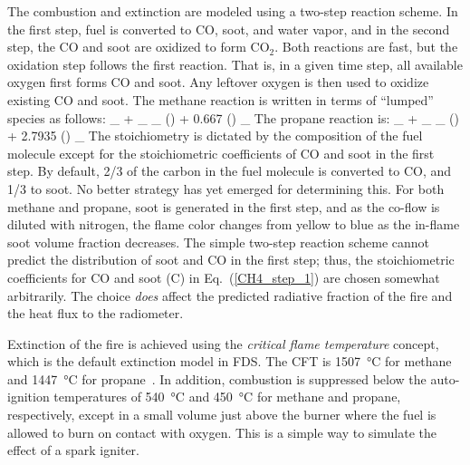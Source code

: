 The combustion and extinction are modeled using a two-step reaction scheme. In the first step, fuel is converted to CO, soot, and water vapor, and in the second step, the CO and soot are oxidized to form CO$_2$. Both reactions are fast, but the oxidation step follows the first reaction. That is, in a given time step, all available oxygen first forms CO and soot. Any leftover oxygen is then used to oxidize existing CO and soot. The methane reaction is written in terms of ``lumped'' species as follows:
\be
{}_ \; +  \; _ \longrightarrow
{}_ \label{CH4_step_1}
\ee
\be
() + 0.667 \; () \longrightarrow  {}_
\ee
The propane reaction is:
\be
{}_ \; +  \; _ \longrightarrow
{}_
\ee
\be
() + 2.7935 \; () \longrightarrow  {}_
\ee
The stoichiometry is dictated by the composition of the fuel molecule except for the stoichiometric coefficients of CO and soot in the first step. By default, 2/3 of the carbon in the fuel molecule is converted to CO, and 1/3 to soot. No better strategy has yet emerged for determining this. For both methane and propane, soot is generated in the first step, and as the co-flow is diluted with nitrogen, the flame color changes from yellow to blue as the in-flame soot volume fraction decreases. The simple two-step reaction scheme cannot predict the distribution of soot and CO in the first step; thus, the stoichiometric coefficients for CO and soot (C) in Eq.~(\ref{CH4_step_1}) are chosen somewhat arbitrarily. The choice {\em does} affect the predicted radiative fraction of the fire and the heat flux to the radiometer.

Extinction of the fire is achieved using the {\em critical flame temperature} concept, which is the default extinction model in FDS. The CFT is 1507~\unit{\degreeCelsius} for methane and 1447~\unit{\degreeCelsius} for propane~\cite{SFPE:Beyler}. In addition, combustion is suppressed below the auto-ignition temperatures of 540~\unit{\degreeCelsius} and 450~\unit{\degreeCelsius} for methane and propane, respectively, except in a small volume just above the burner where the fuel is allowed to burn on contact with oxygen. This is a simple way to simulate the effect of a spark igniter.

